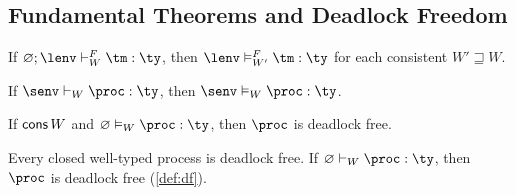 \subsection{Fundamental Theorems and Deadlock Freedom}
\label{sec:fundamental}

\begin{theorem}
\label{thm:fundamental-terms}
If $\varnothing ; \lenv \vdash^{F}_{W} \tm : \ty$, then $\lenv \semt^{F}_{W'} \tm : \ty$ for each consistent $W' \sqsupseteq W$.
\end{theorem}

\begin{theorem}
\label{thm:fundamental-proc}
If $\senv \vdash_{W} \proc : \ty$, then $\senv \semt_{W} \proc : \ty$.
\end{theorem}

\begin{theorem}
\label{thm:adequacy}
If $\mathsf{cons}\,W$ and $\varnothing \semt_{W} \proc : \ty$, then $\proc$ is deadlock free.
\end{theorem}

\begin{theorem}
\label{thm:df}
Every closed well-typed process is deadlock free. If $\varnothing \vdash_{W} \proc : \ty$, then $\proc$ is deadlock free (\cref{def:df}).
\end{theorem}

\FloatBarrier
